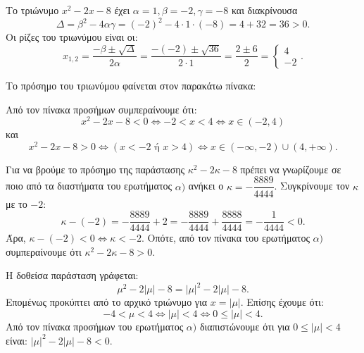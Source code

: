 
\begin{alist}
\item Το τριώνυμο $x^2 - 2x - 8$ έχει $\alpha = 1, \beta = -2, \gamma = -8$ και διακρίνουσα
\[\Delta = \beta^2 - 4\alpha\gamma = (-2)^2 - 4 \cdot 1 \cdot (-8) = 4 + 32 = 36 > 0.\]
Οι ρίζες του τριωνύμου είναι οι:
\[x_{1,2} = \dfrac{-\beta \pm \sqrt{\Delta}}{2\alpha} = \dfrac{-(-2) \pm \sqrt{36}}{2 \cdot 1} = \dfrac{2 \pm 6}{2} = \begin{cases} 4 \\ -2 \end{cases}.\]

Το πρόσημο του τριωνύμου φαίνεται στον παρακάτω πίνακα:

\begin{center}
\end{center}

Από τον πίνακα προσήμων συμπεραίνουμε ότι:
\[x^2 - 2x - 8 < 0 \Leftrightarrow -2 < x < 4 \Leftrightarrow x \in (-2, 4)\]
και
\[x^2 - 2x - 8 > 0 \Leftrightarrow (x < -2 \text{ ή } x > 4) \Leftrightarrow x \in (-\infty, -2) \cup (4, +\infty).\]

\item Για να βρούμε το πρόσημο της παράστασης $\kappa^2 - 2\kappa - 8$ πρέπει να γνωρίζουμε σε ποιο
από τα διαστήματα του ερωτήματος $\alpha)$ ανήκει ο $\kappa = -\dfrac{8889}{4444}$. Συγκρίνουμε τον $\kappa$ με το $-2$:
\[\kappa - (-2) = -\dfrac{8889}{4444} + 2 = -\dfrac{8889}{4444} + \dfrac{8888}{4444} = -\dfrac{1}{4444} < 0.\]
Άρα, $\kappa - (-2) < 0 \Leftrightarrow \kappa < -2$. Οπότε, από τον πίνακα του ερωτήματος $\alpha)$ συμπεραίνουμε
ότι $\kappa^2 - 2\kappa - 8 > 0$.

\item Η δοθείσα παράσταση γράφεται:
\[\mu^2 - 2|\mu| - 8 = |\mu|^2 - 2|\mu| - 8.\]
Επομένως προκύπτει από το αρχικό τριώνυμο για $x = |\mu|$.
Επίσης έχουμε ότι:
\[-4 < \mu < 4 \Leftrightarrow |\mu| < 4 \Leftrightarrow 0 \le |\mu| < 4.\]
Από τον πίνακα προσήμων του ερωτήματος $\alpha)$ διαπιστώνουμε ότι για $0 \le |\mu| < 4$ είναι:
$|\mu|^2 - 2|\mu| - 8 < 0$.
\end{alist}


